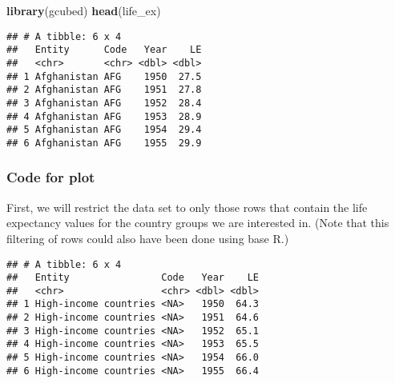 \documentclass[]{book}
\newenvironment{Shaded}{\begin{snugshade}}{\end{snugshade}}
\newcommand{\KeywordTok}[1]{\textcolor[rgb]{0.13,0.29,0.53}{\textbf{#1}}}
\newcommand{\NormalTok}[1]{#1}
\newcommand{\OperatorTok}[1]{\textcolor[rgb]{0.81,0.36,0.00}{\textbf{#1}}}
\newcommand{\StringTok}[1]{\textcolor[rgb]{0.31,0.60,0.02}{#1}}
\begin{document}
\begin{Shaded}
\begin{Highlighting}[]
\KeywordTok{library}\NormalTok{(gcubed)}
\KeywordTok{head}\NormalTok{(life_ex)}
\end{Highlighting}
\end{Shaded}

\begin{verbatim}
## # A tibble: 6 x 4
##   Entity      Code   Year    LE
##   <chr>       <chr> <dbl> <dbl>
## 1 Afghanistan AFG    1950  27.5
## 2 Afghanistan AFG    1951  27.8
## 3 Afghanistan AFG    1952  28.4
## 4 Afghanistan AFG    1953  28.9
## 5 Afghanistan AFG    1954  29.4
## 6 Afghanistan AFG    1955  29.9
\end{verbatim}

\hypertarget{lexcode}{%
\subsubsection*{Code for plot}\label{lexcode}}

First, we will restrict the data set to only those rows that contain the life expectancy values for the country groups we are interested in. (Note that this filtering of rows could also have been done using base R.)

\begin{Shaded}
\end{Shaded}

\begin{verbatim}
## # A tibble: 6 x 4
##   Entity                Code   Year    LE
##   <chr>                 <chr> <dbl> <dbl>
## 1 High-income countries <NA>   1950  64.3
## 2 High-income countries <NA>   1951  64.6
## 3 High-income countries <NA>   1952  65.1
## 4 High-income countries <NA>   1953  65.5
## 5 High-income countries <NA>   1954  66.0
## 6 High-income countries <NA>   1955  66.4
\end{verbatim}
\end{document}
